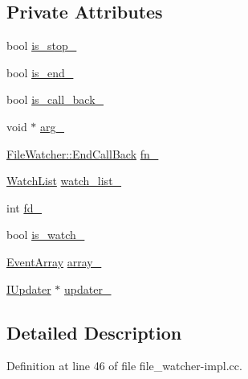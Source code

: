 \subsection*{Private Attributes}
\begin{DoxyCompactItemize}
\item 
bool \hyperlink{classmocha_1_1_file_watcher_1_1_ptr_impl_a268f932a057d3e6e92b0938d69bc6273}{is\_\-stop\_\-}
\item 
bool \hyperlink{classmocha_1_1_file_watcher_1_1_ptr_impl_ac2596e9026a0319cf7300584746be3aa}{is\_\-end\_\-}
\item 
bool \hyperlink{classmocha_1_1_file_watcher_1_1_ptr_impl_af9894b6a727c08a00d378d74657d33d4}{is\_\-call\_\-back\_\-}
\item 
void $\ast$ \hyperlink{classmocha_1_1_file_watcher_1_1_ptr_impl_ac4ef839936e2c0df50e1332884ff32e2}{arg\_\-}
\item 
\hyperlink{classmocha_1_1_file_watcher_af774b8dd436b9f8929506466533831b9}{FileWatcher::EndCallBack} \hyperlink{classmocha_1_1_file_watcher_1_1_ptr_impl_aad15f2df19b37f02b4e688f057cb993a}{fn\_\-}
\item 
\hyperlink{classmocha_1_1_file_watcher_1_1_ptr_impl_a0f2e431afab5a7af053ec48673cc325d}{WatchList} \hyperlink{classmocha_1_1_file_watcher_1_1_ptr_impl_aa51062c0d8ee6c367c2c1372d676d8c1}{watch\_\-list\_\-}
\item 
int \hyperlink{classmocha_1_1_file_watcher_1_1_ptr_impl_ad12b5cd049def2da9eed58c9f8aad348}{fd\_\-}
\item 
bool \hyperlink{classmocha_1_1_file_watcher_1_1_ptr_impl_a2abd26bdb30b1a22d5625705d7b421ea}{is\_\-watch\_\-}
\item 
\hyperlink{classmocha_1_1_file_watcher_1_1_ptr_impl_a0f2e577eda4e2979add6ae59a6c42c63}{EventArray} \hyperlink{classmocha_1_1_file_watcher_1_1_ptr_impl_a7e8eab76d8ad6bcc7e44f756b0eca624}{array\_\-}
\item 
\hyperlink{classmocha_1_1_i_updater}{IUpdater} $\ast$ \hyperlink{classmocha_1_1_file_watcher_1_1_ptr_impl_a5a8ecef4b0e028f33cd5b2d4ba4f926d}{updater\_\-}
\end{DoxyCompactItemize}


\subsection{Detailed Description}


Definition at line 46 of file file\_\-watcher-\/impl.cc.



